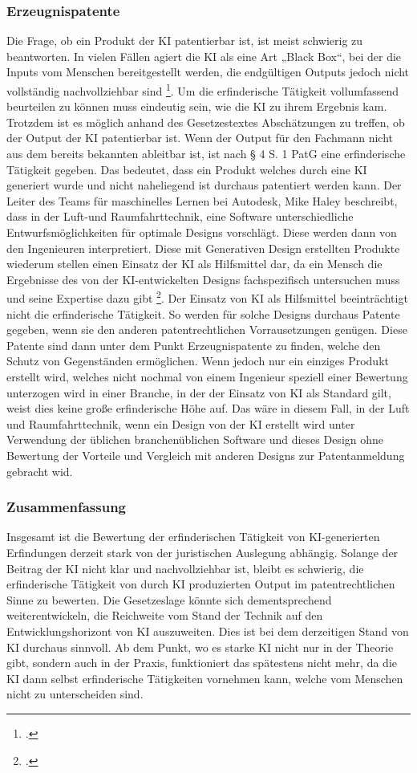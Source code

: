 \subsubsection{Erzeugnispatente}
Die Frage, ob ein Produkt der KI patentierbar ist, ist
meist schwierig zu beantworten.
In vielen Fällen agiert die KI als eine Art „Black Box“, 
bei der die Inputs vom Menschen bereitgestellt werden, 
die endgültigen Outputs jedoch nicht vollständig nachvollziehbar sind 
\footcite{pauliniKIgenerierteErfindungPatentrechtliche}. 
Um die erfinderische Tätigkeit vollumfassend beurteilen zu können
muss eindeutig sein, wie die KI zu ihrem Ergebnis kam. 
Trotzdem ist es möglich anhand des Gesetzestextes Abschätzungen
zu treffen, ob der Output der KI patentierbar ist.
Wenn der Output für den Fachmann nicht aus dem bereits bekannten 
ableitbar ist, ist nach § 4 S. 1 PatG eine erfinderische Tätigkeit gegeben.
Das bedeutet, dass ein Produkt welches durch eine KI generiert
wurde und nicht naheliegend ist durchaus patentiert werden kann.
Der Leiter des Teams für maschinelles Lernen bei Autodesk,
Mike Haley beschreibt, dass in der Luft-und Raumfahrttechnik,
eine Software unterschiedliche Entwurfsmöglichkeiten für optimale
Designs vorschlägt. Diese werden dann von den Ingenieuren interpretiert.
Diese mit Generativen Design erstellten Produkte
wiederum stellen einen Einsatz der KI als Hilfsmittel dar, da
ein Mensch die Ergebnisse des von der KI-entwickelten
Designs fachspezifisch untersuchen muss und seine Expertise dazu
gibt
\footcite{WieManPatente2021}. Der Einsatz von KI
als Hilfsmittel beeinträchtigt nicht die erfinderische Tätigkeit.
So werden für solche Designs durchaus Patente gegeben, 
wenn sie den anderen patentrechtlichen Vorrausetzungen genügen.
Diese Patente sind dann unter dem Punkt Erzeugnispatente zu 
finden, welche den Schutz von Gegenständen ermöglichen.
Wenn jedoch nur ein einziges Produkt erstellt wird, 
welches nicht nochmal von einem Ingenieur speziell 
einer Bewertung unterzogen wird in einer Branche, 
in der der Einsatz von KI als Standard gilt, weist 
dies keine große erfinderische Höhe auf. Das wäre in 
diesem Fall, in der Luft und Raumfahrttechnik,
wenn ein Design von der KI erstellt wird unter 
Verwendung der üblichen branchenüblichen Software
und dieses Design ohne Bewertung der Vorteile und 
Vergleich mit anderen Designs zur Patentanmeldung gebracht wid.
\subsubsection{Zusammenfassung}
Insgesamt ist die Bewertung der erfinderischen Tätigkeit
von KI-generierten Erfindungen derzeit stark von der juristischen Auslegung abhängig. 
Solange der Beitrag der KI nicht klar und nachvollziehbar ist, 
bleibt es schwierig, 
die erfinderische Tätigkeit von durch KI produzierten Output
im patentrechtlichen Sinne zu bewerten.
Die Gesetzeslage könnte sich dementsprechend weiterentwickeln, 
die Reichweite 
vom Stand der Technik auf den Entwicklungshorizont von KI auszuweiten.
Dies ist bei dem derzeitigen Stand von KI durchaus sinnvoll.
Ab dem Punkt, wo es starke KI nicht nur in der Theorie gibt,
sondern auch in der Praxis, funktioniert das spätestens nicht mehr,
da die KI dann selbst erfinderische Tätigkeiten vornehmen kann, welche vom 
Menschen nicht zu unterscheiden sind.
